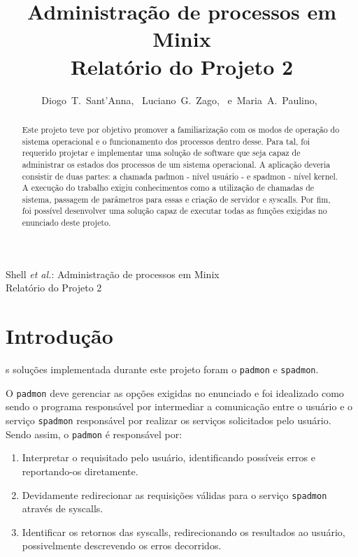 \documentclass[12pt,journal,compsoc]{IEEEtran}
\begin{document}

%
{Shell \MakeLowercase{\textit{et al.}}: Administração de processos em Minix\\Relatório do Projeto 2}

\title{Administração de processos em Minix\\Relatório do Projeto 2}
\author{Diogo~T.~Sant'Anna,~
        Luciano~G.~Zago,~
        e~Maria~A.~Paulino,~
}
\maketitle

\begin{abstract}
Este projeto teve por objetivo promover a familiarização com os modos de operação do sistema operacional e o funcionamento dos processos dentro desse. Para tal, foi  requerido projetar e implementar uma solução de software que seja capaz de administrar os estados dos processos de um sistema operacional. A aplicação deveria consistir de duas partes: a chamada padmon - nível usuário -  e spadmon - nível kernel. A execução do trabalho exigiu conhecimentos como a utilização de chamadas de sistema, passagem de parâmetros para essas e criação de servidor e syscalls. Por fim, foi possível desenvolver uma solução capaz de executar todas as funções exigidas no enunciado deste projeto.
\end{abstract}

\IEEEdisplaynotcompsoctitleabstractindextext

\IEEEpeerreviewmaketitle

\section{Introdução}
s soluções implementada durante este projeto foram o \texttt{padmon} e \texttt{spadmon}.

O \texttt{padmon} deve gerenciar as opções exigidas no enunciado e foi idealizado como sendo o programa responsável por intermediar a comunicação entre o usuário e o serviço \texttt{spadmon} responsável por realizar os serviços solicitados pelo usuário. Sendo assim, o \texttt{padmon} é responsável por:

\begin{enumerate}
\item Interpretar o requisitado pelo usuário, identificando possíveis erros e reportando-os diretamente.
\item Devidamente redirecionar as requisições válidas para o serviço \texttt{spadmon} através de syscalls. 
\item Identificar os retornos das syscalls, redirecionando os resultados ao usuário, possivelmente descrevendo os erros decorridos.
\end{enumerate}
\end{document}
